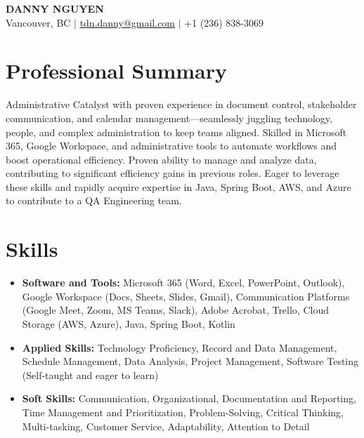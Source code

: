\documentclass[letterpaper,11pt]{article}
\newcommand{\resumeItem}[1]{
\item\small{
{#1 \vspace{-2pt}}
}
}
\newcommand{\resumeSubHeadingListStart}{\begin{itemize}[leftmargin=0.15in, label={}]}
\newcommand{\resumeSubHeadingListEnd}{\end{itemize}}
\begin{document}
\begin{center}
\textbf{\Huge \scshape DANNY NGUYEN} \\ \vspace{1pt}
\small Vancouver, BC $|$ \href{mailto:tdn.danny@gmail.com}{\underline{tdn.danny@gmail.com}} $|$ +1 (236) 838-3069
\end{center}

\section{Professional Summary}
Administrative Catalyst with proven experience in document control, stakeholder communication, and calendar management—seamlessly juggling technology, people, and complex administration to keep teams aligned. Skilled in Microsoft 365, Google Workspace, and administrative tools to automate workflows and boost operational efficiency.  Proven ability to manage and analyze data, contributing to significant efficiency gains in previous roles.  Eager to leverage these skills and rapidly acquire expertise in Java, Spring Boot, AWS, and Azure to contribute to a QA Engineering team.

\section{Skills}
\resumeSubHeadingListStart
\resumeItem{\textbf{Software and Tools:} Microsoft 365 (Word, Excel, PowerPoint, Outlook), Google Workspace (Docs, Sheets, Slides, Gmail), Communication Platforms (Google Meet, Zoom, MS Teams, Slack), Adobe Acrobat, Trello, Cloud Storage (AWS, Azure), Java, Spring Boot, Kotlin}
\resumeItem{\textbf{Applied Skills:} Technology Proficiency, Record and Data Management, Schedule Management, Data Analysis,  Project Management,  Software Testing (Self-taught and eager to learn)}
\resumeItem{\textbf{Soft Skills:} Communication, Organizational, Documentation and Reporting, Time Management and Prioritization, Problem-Solving, Critical Thinking, Multi-tasking, Customer Service, Adaptability, Attention to Detail}
\resumeSubHeadingListEnd
\end{document}
